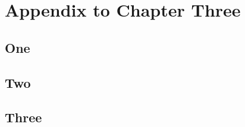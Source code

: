 \chapter{Appendix to Chapter Three}

\section{One}
\lipsum[1]

\section{Two}
\lipsum[2]

\section{Three}
\lipsum[3]